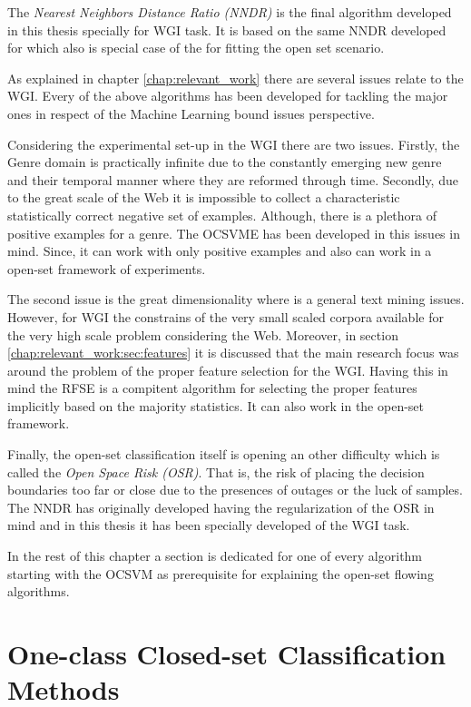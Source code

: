 The \textit{Nearest Neighbors Distance Ratio (NNDR)} is the final algorithm developed in this thesis specially for WGI task. It is based on the same NNDR developed for \parencite{} which also is special case of the  for fitting the open set scenario. 

As explained in chapter \ref{chap:relevant_work} there are several issues relate to the WGI. Every of the above algorithms has been developed for tackling the major ones in respect of the Machine Learning bound issues perspective. 

Considering the experimental set-up in the WGI there are two issues. Firstly, the Genre domain is practically infinite due to the constantly emerging new genre and their temporal manner where they are reformed through time. Secondly, due to the great scale of the Web it is impossible to collect a characteristic statistically correct negative set of examples. Although, there is a plethora of positive examples for a genre. The OCSVME has been developed in this issues in mind. Since, it can work with only positive examples and also can work in a open-set framework of experiments.

The second issue is the great dimensionality where is a general text mining issues. However, for WGI the constrains of the very small scaled corpora available for the very high scale problem considering the Web. Moreover, in section \ref{chap:relevant_work:sec:features} it is discussed that the main research focus was around the problem of the proper feature selection for the WGI. Having this in mind the RFSE is a compitent algorithm for selecting the proper features implicitly based on the majority statistics. It can also work in the open-set framework.

Finally, the open-set classification itself is opening an other difficulty which is called the \textit{Open Space Risk (OSR)}. That is, the risk of placing the decision boundaries too far or close due to the presences of outages or the luck of samples. The NNDR has originally developed having the regularization of the OSR in mind and in this thesis it has been specially developed of the WGI task.

In the rest of this chapter a section is dedicated for one of every algorithm starting with the OCSVM as prerequisite for explaining the open-set flowing algorithms.

\section{One-class Closed-set Classification Methods}\label{chap:openset:sec:One_Class_Classification}



